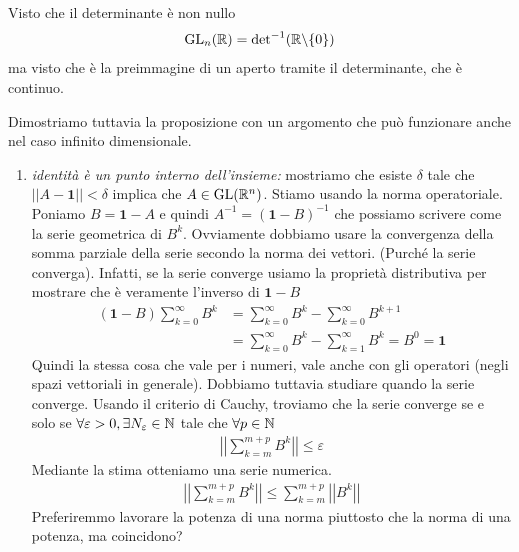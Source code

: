 \documentclass[a4paper]{article}
\begin{document}
\begin{snippetproof}{}
    Visto che il determinante è non nullo
    \[
        \text{GL}_n(\mathbb{R}) = \text{det}^{-1}(\mathbb{R} \backslash \{0\})
    \]
    ma visto che è la preimmagine di un aperto tramite il determinante, che è continuo.

    Dimostriamo tuttavia la proposizione con un argomento che può funzionare anche
    nel caso infinito dimensionale.
    \begin{enumerate}
        \item \emph{identità è un punto interno dell'insieme:} mostriamo che esiste \(\delta\)
        tale che \(||A-\mathbf{1}|| < \delta\) implica che \(A \in \text{GL}(\mathbb{R}^n)\).
        Stiamo usando la norma operatoriale.
        Poniamo \(B = \mathbf{1} - A\) e quindi \(A^{-1} = {(\mathbf{1} - B)}^{-1}\)
        che possiamo scrivere come la serie geometrica di \(B^k\).
        Ovviamente dobbiamo usare la convergenza della somma parziale della serie
        secondo la norma dei vettori. (Purché la serie converga).
        Infatti, se la serie converge usiamo la proprietà distributiva per mostrare che è veramente l'inverso di \(\mathbf{1} - B\)
        \begin{align*}
            (\mathbf{1}-B) \sum_{k=0}^\infty B^k
            &= \sum_{k=0}^\infty B^k - \sum_{k=0}^\infty B^{k+1} \\
            &= \sum_{k=0}^\infty B^k - \sum_{k=1}^\infty B^k = B^0 = \mathbf{1} 
        \end{align*}
        Quindi la stessa cosa che vale per i numeri, vale anche con gli operatori (negli spazi vettoriali in generale).
        Dobbiamo tuttavia studiare quando la serie converge.
        Usando il criterio di Cauchy, troviamo che la serie converge se e solo se \(\forall \varepsilon > 0, \exists N_\varepsilon \in \mathbb{N}\)
        tale che \(\forall p \in \mathbb{N}\) \begin{align*}
            \left|\left|
                \sum_{k=m}^{m+p} B^k
            \right|\right| \leq \varepsilon
        \end{align*}
        Mediante la stima otteniamo una serie numerica.
        \begin{align*}
            \left|\left|
                \sum_{k=m}^{m+p} B^k
            \right|\right| \leq \sum_{k=m}^{m+p}
            \left|\left| B^k \right|\right|
        \end{align*}
        Preferiremmo lavorare la potenza di una norma piuttosto che la norma di una potenza,
        ma coincidono?


\end{enumerate}
\end{snippetproof}
\end{document}
